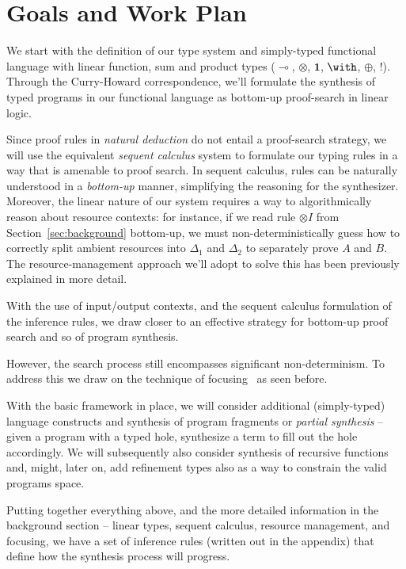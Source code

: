 \documentclass{llncs}
\newcommand{\lolli}{\multimap}
\newcommand{\tensor}{\otimes}
\newcommand{\one}{\mathbf{1}}
\newcommand{\bang}{{!}}
\begin{document}
\section{Goals and Work Plan}

We start with the definition of our type system and simply-typed
functional language with linear function, sum and product types
($\lolli$, $\tensor$, $\one$, $\with$, $\oplus$, $\bang$).  Through
the Curry-Howard correspondence, we'll formulate the synthesis of
typed programs in our functional language as bottom-up proof-search in
linear logic.

Since proof rules in \emph{natural deduction} do not entail a
proof-search strategy, we will use the equivalent \emph{sequent
calculus} system to formulate our typing rules in a way that is
amenable to proof search.
%
In sequent calculus, rules can be naturally understood in a
\emph{bottom-up} manner, simplifying the reasoning for the
synthesizer. Moreover, the linear nature of our system requires a way
to algorithmically reason about resource contexts: for instance, if we
read rule $\tensor I$ from Section~\ref{sec:background} bottom-up, we
must non-deterministically guess how to correctly split ambient
resources into $\Delta_1$ and $\Delta_2$ to separately prove $A$ and
$B$. The resource-management approach we'll adopt to solve this has been 
previously explained in more detail.

With the use of input/output contexts, and the sequent calculus
formulation of the inference rules, we draw closer to an effective
strategy for bottom-up proof search and so of program synthesis.
%

However, the search process still encompasses significant
non-determinism. To address this we draw on the technique of
focusing~\cite{10.1093/logcom/2.3.297,DBLP:conf/cade/ChaudhuriP05} as seen before.

With the basic framework in place, we will consider additional
(simply-typed) language constructs and synthesis of program fragments
or \emph{partial synthesis} -- given a program with a typed hole,
synthesize a term to fill out the hole accordingly. We will
subsequently also consider synthesis of recursive functions and,
might, later on, add refinement types also as a way to constrain the
valid programs space.

Putting together everything above, and the more detailed information in the background section -- linear types, sequent calculus, resource management, and focusing,
we have a set of inference rules (written out in the appendix) that define how the synthesis process will progress.
\end{document}
